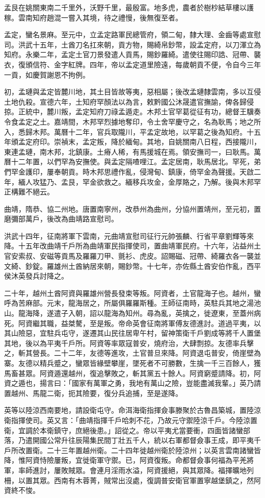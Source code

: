 \begin{pinyinscope}
孟艮在姚關東南二千里外，沃野千里，最殷富。地多虎，農者於樹杪結草樓以護稼。雲南知府趙混一嘗入其境，待之禮慢，後無復至者。

孟定，蠻名景麻。至元中，立孟定路軍民總管府，領二甸，隸大理、金齒等處宣慰司。洪武十五年，土酋刀名扛來朝，貢方物，賜綺帛鈔幣，設孟定府，以刀渾立為知府。永樂二年，孟定土官刀景發遣人貢馬，賜鈔羅綺。遣使往賜印誥、冠帶、襲衣，復頒信符、金字紅牌。四年，帝以孟定道里險遠，每歲朝貢不便，令自今三年一貢，如慶賀謝恩不拘例。

初，孟璉與孟定皆麓川地，其土目皆故等夷，惡相屬；後改孟璉隸雲南，多以互侵土地仇殺。宣德六年，土知府罕顏法以為言，敕黔國公沐晟遣官撫諭，俾各歸侵掠。正統中，麓川叛，孟定知府刀祿孟遁走。木邦土官罕葛從征有功，總督王驥奏令食孟定之土。嘉靖間，木邦罕烈據地奪印，令土舍罕慶守之，名為耿馬；地之所入，悉歸木邦。萬曆十二年，官兵取隴川，平孟定故地，以罕葛之後為知府。十五年頒孟定府印。崇禎末，孟定叛，降於緬甸。其地，自姚關南八日程，西接隴川，東連孟璉，南木邦，北鎮康。土瘠人稀，有馬援城在焉。領安撫司一，曰耿馬。萬曆十二年置，以們罕為安撫使。與孟定隔喳哩江。孟定居南，耿馬居北。罕死，弟們罕金護印，屢奉朝貢。時木邦思禮作亂，侵灣甸、鎮康，倚罕金為聲援。天啟二年，緬人攻猛乃、孟艮，罕金欲救之。緬移兵攻金，金厚賂之，乃解。後與木邦罕正構難不絕云。

曲靖，隋恭、協二州地。唐置南寧州，改恭州為曲州，分協州置靖州，至元初，置磨彌部萬戶，後改為曲靖路宣慰司。

洪武十四年，征南將軍下雲南，元曲靖宣慰司征行元帥張麟、行省平章劉輝等來降。十五年改曲靖千戶所為曲靖軍民指揮使司，置曲靖軍民府。十六年，沾益州土官安索叔、安磁等貢馬及羅羅刀甲、氈衫、虎皮。詔賜磁、冠帶、綺羅衣各一襲並文綺、鈔錠。羅雄州土酋納居來朝，賜鈔幣。十七年，亦佐縣土酋安伯作亂，西平侯沐英發兵討降之。

二十年，越州土酋阿資與羅雄州營長發束等叛。阿資者，土官龍海子也。越州，蠻呼為苦麻部。元末，龍海居之，所屬俱羅羅斯種。王師征南時，英駐兵其地之湯池山。龍海降，遂遣子入朝，詔以龍海為知州。尋為亂，英擒之，徙遼東，至蓋州病死。阿資繼其職，益桀驁，至是叛。帝命英會征南將軍傅友德進討。道過平夷，以其山險惡，宜駐兵屯守，遂遷其山民往居卑午村，留神策衛千戶劉成等將千人置堡其地，後以為平夷千戶所。阿資等率眾寇普安，燒府治，大肆剽掠。友德率兵擊之，斬其營長。二十二年，友德等進攻，土官普旦來降。阿資退屯普安，倚崖壁為寨。友德以精兵蹙之，蠻眾皆緣壁攀崖，墜死者不可勝數，生擒一千三百餘人，獲馬畜甚眾。阿資遁還越州，復追擊敗之，斬其黨五十餘人。阿資窮蹙請降。初，阿資之遁也，揚言曰：「國家有萬軍之勇，我地有萬山之險，豈能盡滅我輩。」英乃請置越州、馬龍二衛，扼其險要，復分兵追捕，至是遂降。

英等以陸涼西南要地，請設衛屯守。命洱海衛指揮僉事滕聚於古魯昌築城，置陸涼衛指揮使司。英又言：「曲靖指揮千戶哈刺不花，乃故元守禦陸涼千戶。今陸涼置衛，宜調於本衛鎮守，庶絕後患。」詔從之。帝以平夷尤當要衝，四面皆諸蠻部落，乃遣開國公常升往辰陽集民間丁壯五千人，統以右軍都督僉事王成，即平夷千戶所改置衛。二十三年置越州衛。二十四年徙越州衛於陸涼州；以英言雲南諸蠻皆降，惟阿資恃險屢叛，宜徙衛軍守禦。已，阿資復叛。命都督僉事何福為平羌將軍，率師進討，屢敗賊眾。會連月淫雨水溢，阿資援絕，與其眾降。福擇曠地列柵，以置其眾。西南有木蓉菁，賊常出沒處，復調普安衛官軍置寧越堡鎮之，然阿資終不悛。


\end{pinyinscope}
